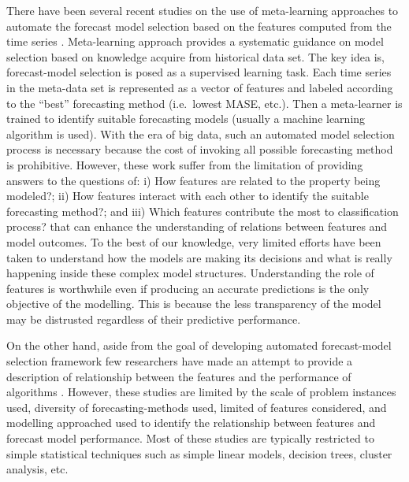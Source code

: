 \documentclass[11pt,a4paper,]{article}
\begin{document}
There have been several recent studies on the use of meta-learning
approaches to automate the forecast model selection based on the
features computed from the time series
\autocites{shah1997model}{prudencio2004meta}{lemke2010meta}{kuck2016meta}.
Meta-learning approach provides a systematic guidance on model selection
based on knowledge acquire from historical data set. The key idea is,
forecast-model selection is posed as a supervised learning task. Each
time series in the meta-data set is represented as a vector of features
and labeled according to the ``best'' forecasting method (i.e.~lowest
MASE, etc.). Then a meta-learner is trained to identify suitable
forecasting models (usually a machine learning algorithm is used). With
the era of big data, such an automated model selection process is
necessary because the cost of invoking all possible forecasting method
is prohibitive. However, these work suffer from the limitation of
providing answers to the questions of: i) How features are related to
the property being modeled?; ii) How features interact with each other
to identify the suitable forecasting method?; and iii) Which features
contribute the most to classification process? that can enhance the
understanding of relations between features and model outcomes. To the
best of our knowledge, very limited efforts have been taken to
understand how the models are making its decisions and what is really
happening inside these complex model structures. Understanding the role
of features is worthwhile even if producing an accurate predictions is
the only objective of the modelling. This is because the less
transparency of the model may be distrusted regardless of their
predictive performance.

On the other hand, aside from the goal of developing automated
forecast-model selection framework few researchers have made an attempt
to provide a description of relationship between the features and the
performance of algorithms
\autocites{schnaars1984situational}{wang2009rule}{lemke2010meta}{petropoulos2014horses}.
However, these studies are limited by the scale of problem instances
used, diversity of forecasting-methods used, limited of features
considered, and modelling approached used to identify the relationship
between features and forecast model performance. Most of these studies
are typically restricted to simple statistical techniques such as simple
linear models, decision trees, cluster analysis, etc.
\end{document}
